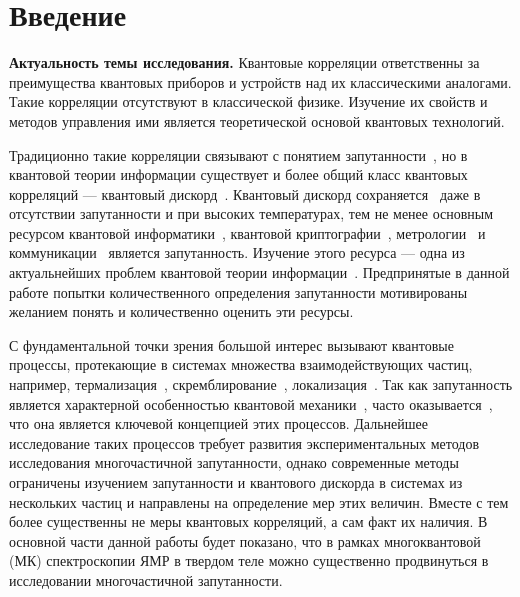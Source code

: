 \chapter*{Введение}


\textbf{Актуальность темы исследования.}
Квантовые корреляции ответственны за преимущества квантовых приборов и устройств над их классическими аналогами.
Такие корреляции отсутствуют в классической физике.
Изучение их свойств и методов управления ими является теоретической основой квантовых технологий.

Традиционно такие корреляции связывают с понятием запутанности~\cite{Einstein1935},
но в квантовой теории информации существует и более общий класс квантовых корреляций --- квантовый дискорд~\cite{Bera2017}.
Квантовый дискорд сохраняется~\cite{Yurishchev2011} даже в отсутствии запутанности и при высоких температурах,
тем не менее основным ресурсом
квантовой информатики~\cite{Arute2019},
квантовой криптографии~\cite{Gisin2002},
метрологии~\cite{Toth2012}
и коммуникации~\cite{Yin2017}
является запутанность.
Изучение этого ресурса --- одна из актуальнейших проблем квантовой теории информации~\cite{Nielsen2000}.
Предпринятые в данной работе попытки количественного определения запутанности мотивированы
желанием понять и количественно оценить эти ресурсы.


С фундаментальной точки зрения большой интерес вызывают квантовые процессы,
протекающие в системах множества взаимодействующих частиц,
например, термализация~\cite{DAlessio2016}, скремблирование~\cite{Hosur2016},  локализация~\cite{Alvarez2010}.
Так как запутанность является характерной особенностью квантовой механики~\cite{Schrodinger1935},
часто оказывается~\cite{Kaufman2016, Neill2016, Garttner2018},
что она является ключевой концепцией этих процессов.
Дальнейшее исследование таких процессов
требует развития экспериментальных методов исследования многочастичной запутанности,
однако современные методы~\cite{Horodecki2009} ограничены изучением запутанности
и квантового дискорда в системах из нескольких частиц
и направлены на определение мер этих величин.
Вместе с тем более существенны не меры квантовых корреляций,
а сам факт их наличия.
В основной части данной работы будет показано,
что в рамках многоквантовой (МК) спектроскопии ЯМР в твердом теле можно существенно продвинуться в исследовании многочастичной запутанности.


